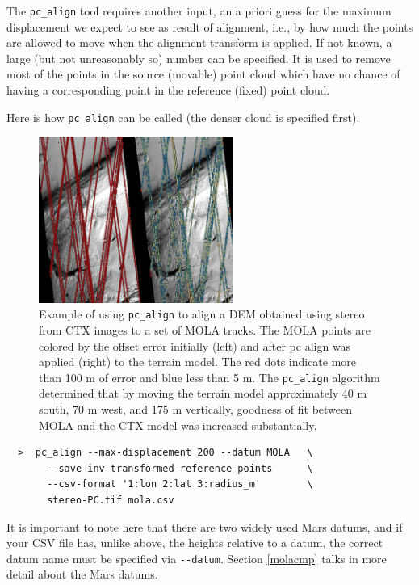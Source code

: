 The \texttt{pc\_align} tool requires another input, an a priori guess for
the maximum displacement we expect to see as result of alignment, i.e.,
by how much the points are allowed to move when the alignment transform is
applied. If not known, a large (but not unreasonably so) number can be
specified. It is used to remove most of the points in the source
(movable) point cloud which have no chance of having a corresponding
point in the reference (fixed) point cloud.

Here is how \texttt{pc\_align} can be called (the denser cloud is
specified first).

\begin{figure}
\hfill
\begin{minipage}{3.5in}
\includegraphics[width=2.5in]{images/examples/align_compare_500px.png}
\end{minipage}
\hfill
\begin{minipage}{2in}
\caption[pc-align comparison]{
Example of using \texttt{pc\_align} to align a DEM obtained using stereo
from CTX images to a set of MOLA tracks. The MOLA points are colored by the offset error
initially (left) and after pc align was applied (right)
to the terrain model. The red dots indicate
more than 100 m of error and blue less than 5 m. The
\texttt{pc\_align} algorithm determined that by moving the terrain
model approximately 40 m south, 70 m west, and
175 m vertically, goodness of
fit between MOLA and the CTX model was increased substantially.
}
\label{pc-align-fig}
\end{minipage}
\hfill
\end{figure}

\begin {verbatim}
  >  pc_align --max-displacement 200 --datum MOLA   \
       --save-inv-transformed-reference-points      \
       --csv-format '1:lon 2:lat 3:radius_m'        \
       stereo-PC.tif mola.csv
\end{verbatim}

It is important to note here that there are two widely used Mars datums,
and if your CSV file has, unlike above, the heights relative to a datum,
the correct datum name must be specified via \texttt{-\/-datum}. Section
\ref{molacmp} talks in more detail about the Mars datums.

